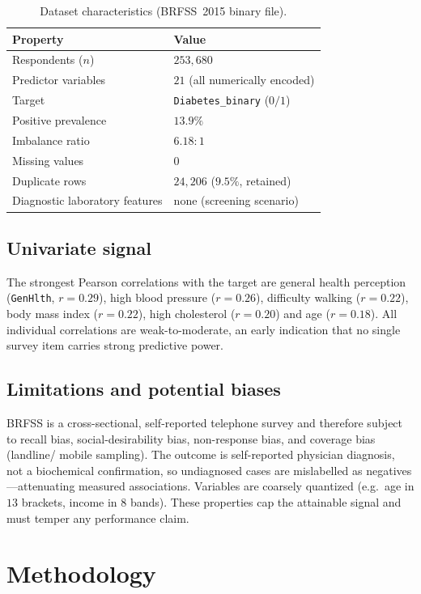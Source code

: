 \documentclass[conference]{IEEEtran}
\begin{document}
\begin{table}[t]
\caption{Dataset characteristics (BRFSS~2015 binary file).}
\label{tab:dataset}
\centering
\begin{tabular}{ll}
\toprule
Property & Value \\
\midrule
Respondents ($n$) & $253{,}680$ \\
Predictor variables & $21$ (all numerically encoded) \\
Target & \texttt{Diabetes\_binary} ($0/1$) \\
Positive prevalence & $13.9\%$ \\
Imbalance ratio & $6.18{:}1$ \\
Missing values & $0$ \\
Duplicate rows & $24{,}206$ ($9.5\%$, retained) \\
Diagnostic laboratory features & none (screening scenario) \\
\bottomrule
\end{tabular}
\end{table}

\subsection{Univariate signal}
The strongest Pearson correlations with the target are general health perception
(\texttt{GenHlth}, $r=0.29$), high blood pressure ($r=0.26$), difficulty walking
($r=0.22$), body mass index ($r=0.22$), high cholesterol ($r=0.20$) and age
($r=0.18$). All individual correlations are weak-to-moderate, an early indication that
no single survey item carries strong predictive power.

\subsection{Limitations and potential biases}
BRFSS is a cross-sectional, self-reported telephone survey and therefore subject to
recall bias, social-desirability bias, non-response bias, and coverage bias (landline/
mobile sampling). The outcome is self-reported physician diagnosis, not a biochemical
confirmation, so undiagnosed cases are mislabelled as negatives---attenuating measured
associations. Variables are coarsely quantized (e.g.\ age in $13$ brackets, income in
$8$ bands). These properties cap the attainable signal and must temper any performance
claim.

\section{Methodology}
\label{sec:methods}
\end{document}
